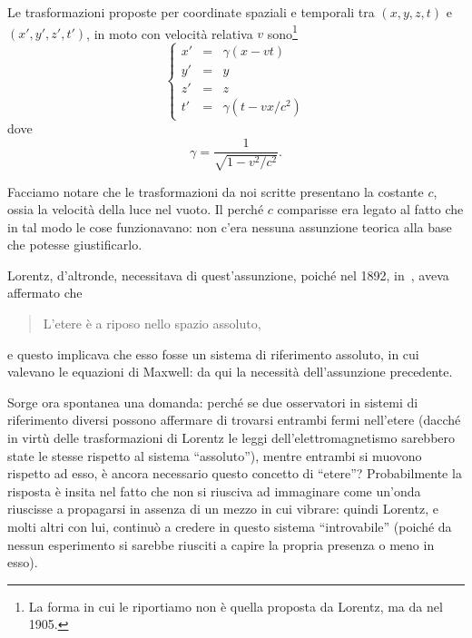 Le trasformazioni proposte per coordinate spaziali e temporali tra
$(x,y,z,t)$ e $ (x',y',z',t')$, in moto con velocit\`a relativa $v$
sono\footnote{La forma in cui le riportiamo non \`e quella proposta da
  Lorentz, ma da \poin{} nel 1905.}
\begin{equation}
  \left\{
    \begin{array}{rcl}
      x' & = & \gamma (x - v t)  \\
      y' & = & y \\
      z' & = & z \\
      t' & = & \gamma (t - v x / c^{2})
    \end{array}
  \right.
  \label{eq:tloris}
\end{equation}
dove 
\begin{equation}
     \gamma = \frac{1}{\sqrt{1 - v^{2}/c^{2}}}.
\end{equation}

\begin{observazione}
  Facciamo notare che le trasformazioni da noi scritte presentano la
  costante $c$, ossia la velocit\`a della luce nel vuoto. Il perch\'e
  $c$ comparisse era legato al fatto che in tal modo le cose
  funzionavano: non c'era nessuna assunzione teorica alla base che
 potesse giustificarlo.

  Lorentz, d'altronde, necessitava di quest'assunzione, poich\'e nel
  1892, in~\cite{loris1892}, aveva affermato che
  \begin{quotation}
    L'etere \`e a riposo nello spazio assoluto,
  \end{quotation}
  e questo implicava che esso fosse un sistema di riferimento
  assoluto, in cui valevano le equazioni di Maxwell: da qui la
  necessit\`a dell'assunzione precedente.
\end{observazione}

Sorge ora spontanea una domanda: perch\'e se due osservatori in
sistemi di riferimento diversi possono affermare di trovarsi entrambi
fermi nell'etere (dacch\'e in virt\`u delle trasformazioni di Lorentz
le leggi dell'elettromagnetismo sarebbero state le stesse rispetto al
sistema ``assoluto''), mentre entrambi si muovono rispetto ad esso,
\`e ancora necessario questo concetto di ``etere''?  \newline
Probabilmente la risposta \`e insita nel fatto che non si riusciva ad
immaginare come un'onda riuscisse a propagarsi in assenza di un mezzo
in cui vibrare: quindi Lorentz, e molti altri con lui, continu\`o a
credere in questo sistema ``introvabile'' (poich\'e da nessun
esperimento si sarebbe riusciti a capire la propria presenza o meno in
esso).
